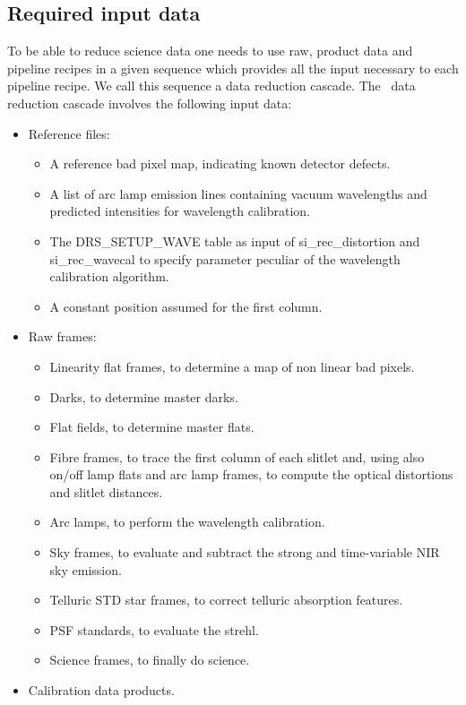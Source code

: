 \subsection{Required input data}
To be able to reduce science data one needs to use raw, product data and 
pipeline recipes in a given sequence which provides all the input necessary 
to each pipeline recipe. We call this sequence a data reduction cascade. 
The \instname\, data reduction cascade involves the following input data:
\begin{itemize}
\item Reference files:
\begin{itemize}
\item A reference bad pixel map, indicating known detector defects.
\item A list of arc lamp emission lines containing vacuum wavelengths and 
predicted intensities for wavelength calibration.
\item The DRS\_SETUP\_WAVE table as input of si\_rec\_distortion and 
      si\_rec\_wavecal to specify parameter peculiar of the wavelength 
      calibration algorithm.
\item A constant position assumed for the first column.
\end{itemize}
\item Raw frames:
\begin{itemize}
\item Linearity flat frames, to determine a map of non linear bad pixels. 
\item Darks, to determine master darks.
\item Flat fields, to determine master flats. 
\item Fibre frames, to trace the first column of each slitlet and, using also 
on/off lamp flats and arc lamp frames, to compute the optical distortions 
and slitlet distances.
\item Arc lamps, to perform the wavelength calibration.
\item Sky frames, to evaluate and subtract the strong and time-variable NIR 
sky emission.
\item Telluric STD star frames, to correct telluric absorption features.
\item PSF standards, to evaluate the strehl.
\item Science frames, to finally do science.
\end{itemize}
\item Calibration data products.
\begin{itemize}

\end{itemize}
\end{itemize}
